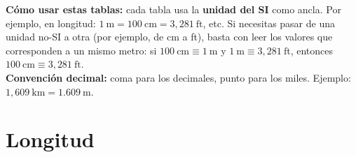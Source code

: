 \documentclass[12pt, letterpaper]{article}
\begin{document}

\vspace{4pt}
\begin{cuadroinfo}
    \small
    \textbf{Cómo usar estas tablas:} cada tabla usa la \textbf{unidad del SI} como
    ancla. Por ejemplo, en longitud: $1\ \text{m} = 100\ \text{cm} = 3{,}281\ \text{ft}$,
    etc. Si necesitas pasar de una unidad no-SI a otra (por ejemplo, de cm a ft),
    basta con leer los valores que corresponden a un mismo metro: si
    $100\ \text{cm} \equiv 1\ \text{m}$ y $1\ \text{m} \equiv 3{,}281\ \text{ft}$,
    entonces $100\ \text{cm} \equiv 3{,}281\ \text{ft}$.\\[4pt]
    \textbf{Convención decimal:} coma para los decimales, punto para los miles.
    Ejemplo: $1{,}609\ \text{km} = 1{.}609\ \text{m}$.
\end{cuadroinfo}

\section{Longitud}
\end{document}
